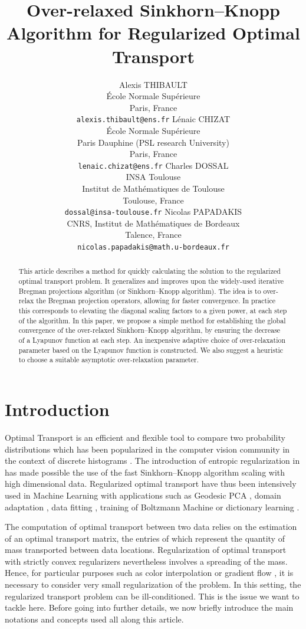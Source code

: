 \documentclass{article} %
\title{Over-relaxed Sinkhorn--Knopp Algorithm for Regularized Optimal Transport}
\author{
Alexis THIBAULT\\
\'Ecole Normale Sup\'erieure\\
Paris, France\\
\texttt{alexis.thibault@ens.fr}
 \And
L\'enaic CHIZAT\\
\'Ecole Normale Sup\'erieure\\ Paris Dauphine (PSL research University)\\
Paris, France\\
\texttt{lenaic.chizat@ens.fr}
 \AND
Charles DOSSAL\\
INSA Toulouse\\
Institut de Math\'ematiques de Toulouse\\
Toulouse,  France\\
\texttt{dossal@insa-toulouse.fr}
\And 
Nicolas PAPADAKIS\\
CNRS, Institut de Math\'ematiques de Bordeaux\\
Talence, France\\
\texttt{nicolas.papadakis@math.u-bordeaux.fr}
}
\theoremstyle{plain}
\theoremstyle{definition}
\theoremstyle{remark}
\begin{document}
\maketitle

\begin{abstract}
This article describes a method for quickly calculating the solution to the regularized optimal transport problem. It generalizes and improves upon the widely-used iterative Bregman projections algorithm (or Sinkhorn--Knopp algorithm). 
The idea is to over-relax the Bregman projection operators, allowing for faster convergence. In practice this corresponds to elevating the diagonal scaling factors to a given power, at each step of the algorithm.
In this paper, we propose a simple method for establishing the global convergence of the over-relaxed Sinkhorn--Knopp algorithm, by ensuring the decrease of a Lyapunov function at each step.
An inexpensive adaptive choice of over-relaxation parameter based on the Lyapunov function is constructed.
We also suggest a heuristic to choose a suitable asymptotic over-relaxation parameter.
\end{abstract}

\section{Introduction}
Optimal Transport is an efficient and flexible tool to compare two probability distributions which has been popularized in the computer vision community in the context of discrete histograms \cite{Rubner2000}. The introduction of entropic regularization in \cite{cuturi13} has made possible the use of the fast Sinkhorn--Knopp algorithm \cite{sinkhorn64}   scaling with high dimensional data. 
Regularized optimal transport have thus been intensively used  in  Machine Learning with applications such as   Geodesic PCA \cite{seguy2015principal}, domain adaptation \cite{2015arXiv150700504C}, data fitting \cite{2015arXiv150605439F},  training of Boltzmann Machine \cite{NIPS2016_6248}  or dictionary learning \cite{Rolet2016,2017arXiv170801955S}.

The computation of optimal transport between two data relies on the estimation of an optimal transport matrix, the entries of which represent the quantity of mass transported between  data locations. 
Regularization of optimal transport with strictly convex regularizers \cite{cuturi13, dessein2016}  nevertheless involves a spreading of the mass. Hence, for particular purposes such as color interpolation \cite{Rabin2014} or gradient flow \cite{2016arXiv160705816C}, it is  necessary  to consider very small regularization of the problem.
In this setting,  the regularized transport problem can be ill-conditioned. This is the issue  we want to tackle here.
Before going into further details, we now briefly introduce the main notations and concepts used all along this article.
\end{document}
